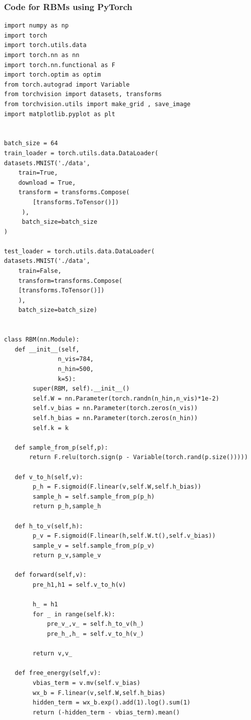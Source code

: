 \documentclass{beamer}
\begin{document}
\begin{frame}
\frametitle{Code for RBMs using PyTorch}

\begin{verbatim}
import numpy as np
import torch
import torch.utils.data
import torch.nn as nn
import torch.nn.functional as F
import torch.optim as optim
from torch.autograd import Variable
from torchvision import datasets, transforms
from torchvision.utils import make_grid , save_image
import matplotlib.pyplot as plt


batch_size = 64
train_loader = torch.utils.data.DataLoader(
datasets.MNIST('./data',
    train=True,
    download = True,
    transform = transforms.Compose(
        [transforms.ToTensor()])
     ),
     batch_size=batch_size
)

test_loader = torch.utils.data.DataLoader(
datasets.MNIST('./data',
    train=False,
    transform=transforms.Compose(
    [transforms.ToTensor()])
    ),
    batch_size=batch_size)


class RBM(nn.Module):
   def __init__(self,
               n_vis=784,
               n_hin=500,
               k=5):
        super(RBM, self).__init__()
        self.W = nn.Parameter(torch.randn(n_hin,n_vis)*1e-2)
        self.v_bias = nn.Parameter(torch.zeros(n_vis))
        self.h_bias = nn.Parameter(torch.zeros(n_hin))
        self.k = k
    
   def sample_from_p(self,p):
       return F.relu(torch.sign(p - Variable(torch.rand(p.size()))))
    
   def v_to_h(self,v):
        p_h = F.sigmoid(F.linear(v,self.W,self.h_bias))
        sample_h = self.sample_from_p(p_h)
        return p_h,sample_h
    
   def h_to_v(self,h):
        p_v = F.sigmoid(F.linear(h,self.W.t(),self.v_bias))
        sample_v = self.sample_from_p(p_v)
        return p_v,sample_v
        
   def forward(self,v):
        pre_h1,h1 = self.v_to_h(v)
        
        h_ = h1
        for _ in range(self.k):
            pre_v_,v_ = self.h_to_v(h_)
            pre_h_,h_ = self.v_to_h(v_)
        
        return v,v_
    
   def free_energy(self,v):
        vbias_term = v.mv(self.v_bias)
        wx_b = F.linear(v,self.W,self.h_bias)
        hidden_term = wx_b.exp().add(1).log().sum(1)
        return (-hidden_term - vbias_term).mean()





\end{verbatim}
\end{frame}
\end{document}

